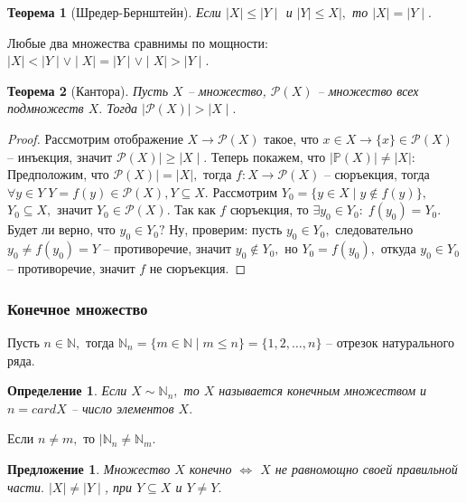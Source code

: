 \documentclass{article}
\newtheorem{Proposition}{Предложение}[section]
\newtheorem{Theorem}{Теорема}[section]
\newtheorem{Definition}{Определение}[section]
\begin{document}
\begin{Theorem}[Шредер-Бернштейн]
Если $\mid X\mid\leq\mid Y\mid$ и $\mid Y\mid\leq X\mid,$ то $\mid X\mid = \mid Y\mid.$
\end{Theorem} 

Любые два множества сравнимы по мощности: $\mid X\mid<\mid Y\mid\vee \mid X\mid=\mid Y\mid\vee \mid X\mid>\mid Y\mid.$ 

\begin{Theorem}[Кантора]
Пусть $X$ -- множество, $\mathcal{P}(X)$ -- множество всех подмножеств $X.$ Тогда $\mid\mathcal{P}(X)\mid >\mid X\mid.$
\end{Theorem}
\begin{proof}
Рассмотрим отображение $X\rightarrow\mathcal{P}(X)$ такое, что $x\in X \rightarrow\{x\}\in\mathcal{P}(X)$ -- инъекция, значит $\mathcal{P}(X)\mid\geq\mid X\mid.$ Теперь покажем, что $\mid \mathbb{P}(X)\mid \neq\mid X\mid:$\\

Предположим, что $\mathcal{P}(X)\mid=\mid X\mid,$ тогда $f:X \rightarrow \mathcal{P}(X)$ -- сюръекция, тогда $\forall y \in Y \; Y=f(y)\in\mathcal{P}(X), Y\subseteq X.$ Рассмотрим $Y_0=\{y\in X\mid y\notin f(y)\},$  $Y_0\subseteq X,$ значит $Y_0\in\mathcal{P}(X).$ Так как $f$ сюръекция, то $\exists y_0 \in Y_0: \; f(y_0)=Y_0.$\\

Будет ли верно, что $y_0\in Y_0?$ Ну, проверим: пусть $y_0\in Y_0,$ следовательно $y_0 \neq f(y_0)=Y$ -- противоречие, значит $y_0 \notin Y_0,$ но $Y_0 = f(y_0),$ откуда $y_0\in Y_0$ -- противоречие, значит $f$ не сюръекция.
\end{proof}
\smallskip
\smallskip
\subsubsection{Конечное множество}
Пусть $n\in\mathbb{N},$ тогда $\mathbb{N}_n=\{m\in\mathbb{N}\mid m\leq n\}=\{1, 2,\ldots, n\}$ -- отрезок натурального ряда.
\begin{Definition}
Если $X\sim \mathbb{N}_n,$ то $X$ называется конечным множеством и $n=card X$ -- число элементов $X.$
\end{Definition}

Если $n\neq m,$ то $\mid\mathbb{N}_n\neq\mathbb{N}_m.$

\begin{Proposition}
Множество $X$ конечно $\Leftrightarrow$ $X$ не равномощно своей правильной части$.$ $\mid X\mid\neq\mid Y\mid$, при $Y\subseteq X$ и $Y\neq Y.$
\end{Proposition}
\end{document}
